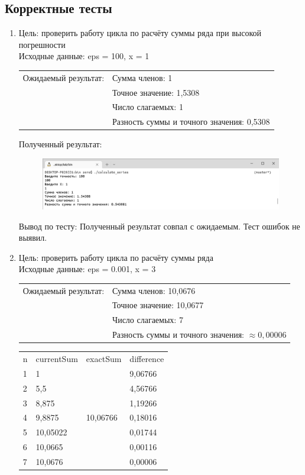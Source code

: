 \documentclass[a4paper]{article}
\begin{document}
	\subsection{Корректные тесты}
	\begin{enumerate}[label=\textbf{Тест \arabic*},start=3]
		\item Цель: проверить работу цикла по расчёту суммы ряда при высокой погрешности \\
		Исходные данные: eps = 100, x = 1 \\
		
		\begin{tabular}{l l}
			Ожидаемый результат: & Сумма членов: 1 \\
			& Точное значение: 1,5308 \\
			& Число слагаемых: 1 \\
			& Разность суммы и точного значения: 0,5308 \\[4mm]
		\end{tabular}
	
		Полученный результат:
		
		\begin{figure}[h]
			\includegraphics[width=\textwidth,trim=0.5mm 0 0 0.5mm,clip]{tests/test100.png}
		\end{figure}
		
		Вывод по тесту: Полученный результат совпал с ожидаемым. Тест ошибок не выявил.
		\newpage
		
		\item Цель: проверить работу цикла по расчёту суммы ряда \\
		Исходные данные: eps = 0.001, x = 3 \\
		
		\begin{tabular}{l l}
			Ожидаемый результат: & Сумма членов: 10,0676 \\
			& Точное значение: 10,0677 \\
			& Число слагаемых: 7 \\
			& Разность суммы и точного значения: $\approx 0,00006$ \\[4mm]
		\end{tabular}
		
		\begin{tabular}{l|l|l|l}
			n & currentSum & exactSum & difference  \\
			1 &  1  &\multirow{7}{*}{10,06766}& 9,06766 \\
			2 &  5,5  &       & 4,56766 \\
			3 &  8,875  &     & 1,19266 \\
			4 &  9,8875  &    & 0,18016 \\
			5 &  10,05022 &   & 0,01744 \\
			6 &  10,0665  &   & 0,00116 \\
			7 &  10,0676  &   & 0,00006 \\
		\end{tabular}
		

\end{enumerate}
\end{document}
